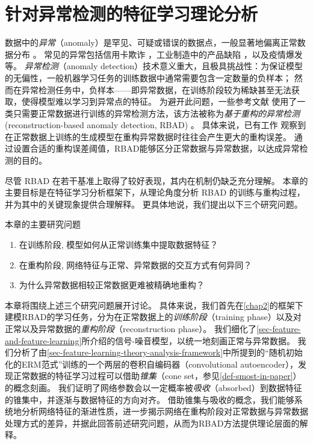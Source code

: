 \chapter{针对异常检测的特征学习理论分析}\label{chap4}

数据中的\textit{异常}（anomaly）是罕见、可疑或错误的数据点，一般显著地偏离正常数据分布 \cite{DBLP:journals/corr/abs-1901-03407,DBLP:journals/pieee/RuffKVMSKDM21}。
常见的异常包括信用卡欺诈 \cite{credit-card-fraud-2011}，工业制造中的产品缺陷 \cite{DBLP:journals/ijcv/BergmannBFSS21}，以及疫情爆发 \cite{ourbreaks-of-disease-2023}等。
\textit{异常检测}（anomaly detection）技术意义重大，且极具挑战性：为保证模型的无偏性，一般机器学习任务的训练数据中通常需要包含一定数量的负样本；
然而在异常检测任务中，负样本——即异常数据，在训练阶段较为稀缺甚至无法获取，使得模型难以学习到异常点的特征。
为避开此问题，一些参考文献 \cite{DBLP:conf/cvpr/SalehiSBRR21,DBLP:journals/corr/abs-2305-15956} 使用了一类只需要正常数据进行训练的异常检测方法，该方法被称为\textit{基于重构的异常检测} (reconstruction-based anomaly detection, RBAD) \cite{DBLP:journals/corr/abs-2305-18593,DBLP:conf/icml/LvSWXX24,DBLP:conf/icml/LiF0CWHSQZ24}。
具体来说，已有工作 \cite{DBLP:conf/cvpr/SalehiSBRR21,DBLP:journals/corr/abs-2305-15956} 观察到在正常数据上训练的生成模型在重构异常数据时往往会产生更大的重构误差。
通过设置合适的重构误差阈值，RBAD能够区分正常数据与异常数据，以达成异常检测的目的。

尽管 RBAD 在若干基准上取得了较好表现，其内在机制仍缺乏充分理解。
本章的主要目标是在特征学习分析框架下，从理论角度分析 RBAD 的训练与重构过程，并为其中的关键现象提供合理解释。
更具体地说，我们提出以下三个研究问题。
\begin{mynote}{本章的主要研究问题}
    \begin{enumerate}
        \item {在训练阶段, 模型如何从正常训练集中提取数据特征？}
        \item {在重构阶段, 网络特征与正常、异常数据的交互方式有何异同？}
        \item {为什么异常数据相较正常数据更难被精确地重构？}
    \end{enumerate}
\end{mynote}

本章将围绕上述三个研究问题展开讨论。
具体来说，我们首先在\cref{chap2}的框架下建模RBAD的学习任务，分为在正常数据上的\emph{训练阶段}（training phase）以及对正常以及异常数据的\emph{重构阶段}（reconstruction phase）。
我们细化了\cref{sec-feature-and-feature-learning}所介绍的信号-噪音模型，以统一地刻画正常与异常数据。
我们分析了由\cref{sec-feature-learning-theory-analysis-framework}中所提到的“随机初始化的ERM范式”训练的一个两层的卷积自编码器（convolutional autoencoder），发现正常数据的特征学习过程可以借助\emph{锥集}（cone set，参见\cref{def-smost-in-paper}\!）的概念刻画。
我们证明了网络参数会以一定概率被\emph{吸收}（absorbed）到数据特征的锥集中，并逐渐与数据特征的方向对齐。
借助锥集与吸收的概念，我们能够系统地分析网络特征的渐进性质，进一步揭示网络在重构阶段对正常数据与异常数据处理方式的差异，并据此回答前述研究问题，从而为RBAD方法提供理论层面的解释。

